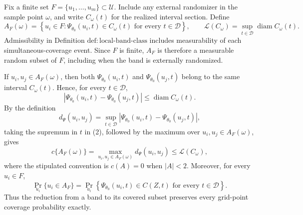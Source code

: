 Fix a finite set \(F=\{u_1,\ldots,u_m\}\subset\mathcal U\).  Include any external randomizer in the sample point \(\omega\), and write \(C_\omega(t)\) for the realized interval section.  Define
\[
 A_F(\omega)
 =\left\{u_i\in F:\Psi_{\theta_0}(u_i,t)\in C_\omega(t)
       \text{ for every }t\in\mathcal D\right\},
 \qquad
 \mathcal L(C_\omega)
 =\sup_{t\in\mathcal D}\operatorname{diam}C_\omega(t).
\tag{1}
\]
Admissibility in Definition \(\mathrm{def:local\mbox{-}band\mbox{-}class}\) includes measurability of each simultaneous-coverage event.  Since \(F\) is finite, \(A_F\) is therefore a measurable random subset of \(F\), including when the band is externally randomized.

If \(u_i,u_j\in A_F(\omega)\), then both \(\Psi_{\theta_0}(u_i,t)\) and \(\Psi_{\theta_0}(u_j,t)\) belong to the same interval \(C_\omega(t)\).  Hence, for every \(t\in\mathcal D\),
\[
 \left|\Psi_{\theta_0}(u_i,t)-\Psi_{\theta_0}(u_j,t)\right|
 \leq \operatorname{diam}C_\omega(t).
\tag{2}
\]
By the definition
\[
 d_\Psi(u_i,u_j)
 =\sup_{t\in\mathcal D}
   \left|\Psi_{\theta_0}(u_i,t)-\Psi_{\theta_0}(u_j,t)\right|,
\]
taking the supremum in \(t\) in (2), followed by the maximum over \(u_i,u_j\in A_F(\omega)\), gives
\[
 c\{A_F(\omega)\}
 =\max_{u_i,u_j\in A_F(\omega)}d_\Psi(u_i,u_j)
 \leq \mathcal L(C_\omega),
\tag{3}
\]
where the stipulated convention is \(c(A)=0\) when \(|A|<2\).  Moreover, for every \(u_i\in F\),
\[
 \Pr_{u_i}\{u_i\in A_F\}
 =\Pr_{u_i}\!\left\{
   \Psi_{\theta_0}(u_i,t)\in C(Z,t)
   \text{ for every }t\in\mathcal D\right\}.
\tag{4}
\]
Thus the reduction from a band to its covered subset preserves every grid-point coverage probability exactly.

